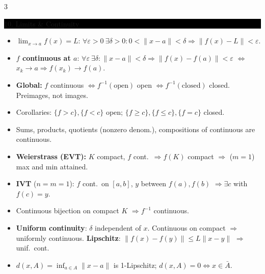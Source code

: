 \documentclass[8pt,letterpaper]{article}
\makeatletter
\newcommand{\sect}[1]{%
  \vspace{2.2pt}%
  \noindent\colorbox{black}{\parbox{\dimexpr\linewidth-2\fboxsep}{%
    \color{white}\bfseries\scshape\fontsize{6.4}{7.4}\selectfont
    \hyphenpenalty=10000\exhyphenpenalty=10000\raggedright #1}}%
  \vspace{1.4pt}\par\nopagebreak\@afterheading}
\newenvironment{tl}
  {\begin{itemize}[leftmargin=6pt,itemsep=0.3pt,topsep=1pt,parsep=0pt,
                   partopsep=0pt,label=\textcolor{gray}{\tiny$\bullet$}]}
  {\end{itemize}}
\newcommand{\nm}[1]{\lVert #1\rVert}
\makeatother
\begin{document}
\begin{multicols}{3}
\sect{10. Limits \& Continuity}
\begin{tl}
\item $\lim_{x\to a}f(x)=L$: $\forall\varepsilon>0\ \exists\delta>0: 0<\nm{x-a}<\delta\Rightarrow\nm{f(x)-L}<\varepsilon$.
\item \textbf{$f$ continuous at $a$}: $\forall\varepsilon\ \exists\delta:\nm{x-a}<\delta\Rightarrow\nm{f(x)-f(a)}<\varepsilon$ $\iff$ $x_k\to a\Rightarrow f(x_k)\to f(a)$.
\item \textbf{Global:} $f$ continuous $\iff f^{-1}(\text{open})$ open $\iff f^{-1}(\text{closed})$ closed. \colorbox{black!12}{Preimages, not images.}
\item Corollaries: $\{f>c\},\{f<c\}$ open; $\{f\ge c\},\{f\le c\},\{f=c\}$ closed.
\item Sums, products, quotients (nonzero denom.), compositions of continuous are continuous.
\item \textbf{Weierstrass (EVT):} $K$ compact, $f$ cont.\ $\Rightarrow f(K)$ compact $\Rightarrow$ ($m=1$) max and min attained.
\item \textbf{IVT} ($n=m=1$): $f$ cont.\ on $[a,b]$, $y$ between $f(a),f(b)$ $\Rightarrow\exists c$ with $f(c)=y$.
\item Continuous bijection on compact $K$ $\Rightarrow f^{-1}$ continuous.
\item \textbf{Uniform continuity}: $\delta$ independent of $x$. Continuous on compact $\Rightarrow$ uniformly continuous. \textbf{Lipschitz}: $\nm{f(x)-f(y)}\le L\nm{x-y}$ $\Rightarrow$ unif.\ cont.
\item $d(x,A)=\inf_{a\in A}\nm{x-a}$ is 1-Lipschitz; $d(x,A)=0\iff x\in\bar A$.
\end{tl}


\end{multicols}
\end{document}

